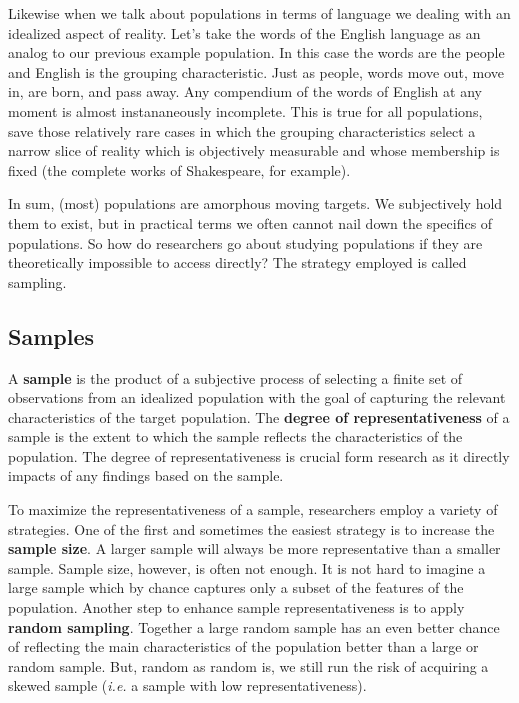 \documentclass[
  letterpaper,
]{latex/krantz}
\begin{document}
Likewise when we talk about populations in terms of language we dealing
with an idealized aspect of reality. Let's take the words of the English
language as an analog to our previous example population. In this case
the words are the people and English is the grouping characteristic.
Just as people, words move out, move in, are born, and pass away. Any
compendium of the words of English at any moment is almost
instananeously incomplete. This is true for all populations, save those
relatively rare cases in which the grouping characteristics select a
narrow slice of reality which is objectively measurable and whose
membership is fixed (the complete works of Shakespeare, for example).

In sum, (most) populations are amorphous moving targets. We subjectively
hold them to exist, but in practical terms we often cannot nail down the
specifics of populations. So how do researchers go about studying
populations if they are theoretically impossible to access directly? The
strategy employed is called sampling.

\hypertarget{samples}{%
\subsection{Samples}\label{samples}}

A \textbf{sample} is the product of a subjective process
of selecting a finite set of observations from an idealized population
with the goal of capturing the relevant characteristics of the target
population. The \textbf{degree of representativeness} of a sample is the
extent to which the sample reflects the characteristics of the
population. The degree of representativeness is crucial form research as
it directly impacts of any findings based on the sample.

To maximize the representativeness of a sample, researchers employ a
variety of strategies. One of the first and sometimes the easiest
strategy is to increase the \textbf{sample size}. A
larger sample will always be more representative than a smaller sample.
Sample size, however, is often not enough. It is not hard to imagine a
large sample which by chance captures only a subset of the features of
the population. Another step to enhance sample representativeness is to
apply \textbf{random sampling}. Together a large random sample has an
even better chance of reflecting the main characteristics of the
population better than a large or random sample. But, random as random
is, we still run the risk of acquiring a skewed sample (\emph{i.e.} a
sample with low representativeness).
\end{document}
